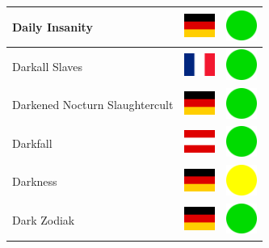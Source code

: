 \documentclass[12pt, a4paper, twoside]{report}
\begin{document}
\begin{center}
\begin{longtable}{|p{5cm}|p{2cm}|p{2cm}|}
 Daily Insanity                                             & \includegraphics[width=1cm]{../4x3/de} &   \includegraphics[width=1cm]{../likes/y} \\ \hline
 Darkall Slaves                                             & \includegraphics[width=1cm]{../4x3/fr} &   \includegraphics[width=1cm]{../likes/y} \\ \hline
 Darkened Nocturn Slaughtercult                             & \includegraphics[width=1cm]{../4x3/de} &   \includegraphics[width=1cm]{../likes/y} \\ \hline
 Darkfall                                                   & \includegraphics[width=1cm]{../4x3/at} &   \includegraphics[width=1cm]{../likes/y} \\ \hline
 Darkness                                                   & \includegraphics[width=1cm]{../4x3/de} &   \includegraphics[width=1cm]{../likes/m} \\ \hline
 Dark Zodiak                                                & \includegraphics[width=1cm]{../4x3/de} &   \includegraphics[width=1cm]{../likes/y} \\ \hline

\end{longtable}
\end{center}
\end{document}
